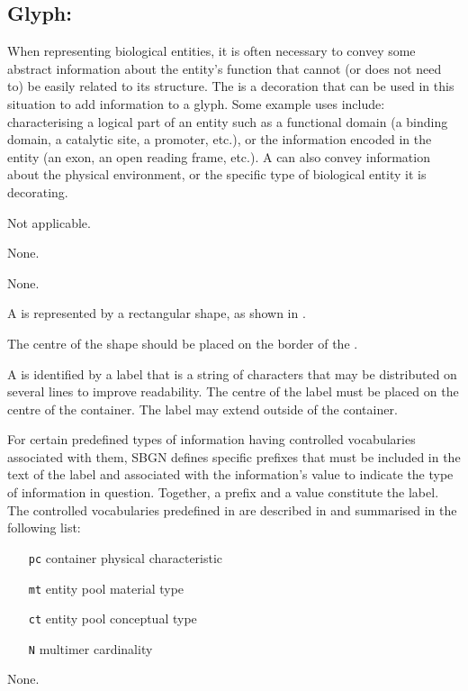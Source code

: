 
\subsection{Glyph: }
\label{sec:unitInfo}

When representing biological entities, it is often necessary to convey some abstract information about the entity's function that cannot (or does not need to) be easily related to its structure.
The  is a decoration that can be used in this situation to add information to a glyph.
Some example uses include: characterising a logical part of an entity such as a functional domain (a binding domain, a catalytic site, a promoter, etc.), or the information encoded in the entity (an exon, an open reading frame, etc.).
A  can also convey information about the physical environment, or the specific type of biological entity it is decorating.

\begin{glyphDescription}

\glyphSboTerm
Not applicable.


\glyphIncoming
None.



\glyphOutgoing
None.


\glyphContainer
A  is represented by a rectangular shape, as shown in .


The centre of the shape should be placed on the border of the .
% 

\glyphLabel
A  is identified by a label that is  a string of characters that may be distributed on several lines to improve readability.
The centre of the label must be placed on the centre of the container.
The label may extend outside of the container.
  
For certain predefined types of information having controlled vocabularies associated with them, SBGN defines specific prefixes that must be included in the text of the label and associated with the information's value to indicate the type of information in question. Together, a prefix and a value constitute the label. The controlled vocabularies predefined in \SBGNPDLone are described in  and summarised in the following list:

\begin{center}
  \begin{itemize}\setlength{\parskip}{0ex}
  \item[\texttt{pc}] container physical characteristic
  \item[\texttt{mt}] entity pool material type
  \item[\texttt{ct}] entity pool conceptual type
  \item[\texttt{N}]  multimer cardinality
  \end{itemize}
  
\end{center}

\glyphAux
None.

\end{glyphDescription}

